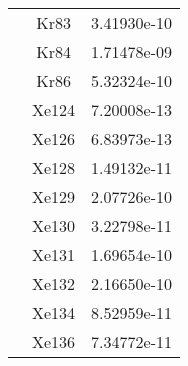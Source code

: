 \begin{centering}
\begin{longtable}{l c c}
& Kr83 & 3.41930e-10 \\ 
& Kr84 & 1.71478e-09 \\ 
& Kr86 & 5.32324e-10 \\ 
& Xe124 & 7.20008e-13 \\ 
& Xe126 & 6.83973e-13 \\ 
& Xe128 & 1.49132e-11 \\ 
& Xe129 & 2.07726e-10 \\ 
& Xe130 & 3.22798e-11 \\ 
& Xe131 & 1.69654e-10 \\ 
& Xe132 & 2.16650e-10 \\ 
& Xe134 & 8.52959e-11 \\ 
& Xe136 & 7.34772e-11 \\ 
\hline
\bottomrule
\end{longtable}
\end{centering}
